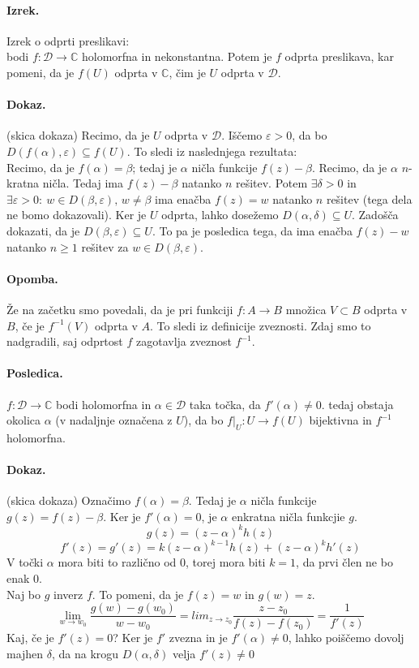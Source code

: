 \documentclass[a4paper]{article}
\newcommand{\C}{\mathbb{C}}
\newcommand{\fn}[3]{{#1}\colon {#2} \rightarrow {#3}}
\begin{document}
\paragraph{Izrek.} Izrek o odprti preslikavi: \\
bodi $\fn{f}{\mathcal{D}}{\C}$ holomorfna in nekonstantna. Potem je $f$ odprta preslikava, kar pomeni,
da je $f(U)$ odprta v $\C$, čim je $U$ odprta v $\mathcal{D}$.
\paragraph{Dokaz.} (skica dokaza) Recimo, da je $U$ odprta v $\mathcal{D}$. Iščemo $\varepsilon>0$, da bo $D(f(\alpha),\varepsilon) \subseteq f(U)$. To sledi iz naslednjega rezultata: \\
Recimo, da je $f(\alpha) = \beta$; tedaj je $\alpha$ ničla funkcije $f(z) - \beta$. Recimo, da je $\alpha$ $n$-kratna ničla. Tedaj ima $f(z) - \beta$ natanko $n$ rešitev.
Potem $\exists \delta > 0$ in $\exists \varepsilon > 0:~w\in D(\beta, \varepsilon),\,w\neq\beta$ ima enačba $f(z)=w$ natanko $n$ rešitev (tega dela ne bomo dokazovali).
Ker je $U$ odprta, lahko dosežemo $D(\alpha, \delta) \subseteq U$. Zadošča dokazati, da je $D(\beta, \varepsilon) \subseteq U$. To pa je posledica tega, da ima enačba $f(z) - w$ natanko $n \geq 1$ rešitev za $w \in D(\beta, \varepsilon)$.
\paragraph{Opomba.} Že na začetku smo povedali, da je pri funkciji $\fn{f}{A}{B}$ množica $V \subset B$ odprta v $B$, če je $f^{-1}(V)$ odprta v $A$. To sledi iz definicije zveznosti. Zdaj smo to nadgradili, saj odprtost $f$ zagotavlja zveznost $f^{-1}$.
\paragraph{Posledica.} $\fn{f}{\mathcal{D}}{\C}$ bodi holomorfna in $\alpha \in \mathcal{D}$ taka točka, da $f'(\alpha) \neq 0$. tedaj obstaja okolica $\alpha$ (v nadaljnje označena z $U$), da bo $\displaystyle{f\big|_U\colon U \to f(U)}$ bijektivna in $f^{-1}$ holomorfna.
\paragraph{Dokaz.} (skica dokaza) Označimo $f(\alpha) = \beta$. Tedaj je $\alpha$ ničla funkcije $g(z) = f(z) - \beta$. Ker je $f'(\alpha) = 0$, je $\alpha$ enkratna ničla funkcjie $g$.
$$g(z) = (z-\alpha)^kh(z)$$
$$f'(z) = g'(z) = k(z-\alpha)^{k-1}h(z) + (z-\alpha)^kh'(z)$$
V točki $\alpha$ mora biti to različno od $0$, torej mora biti $k=1$, da prvi člen ne bo enak 0. \\
Naj bo $g$ inverz $f$. To pomeni, da je $f(z) = w$ in $g(w) = z$. \\
$$\lim_{w \to w_0} \frac{g(w) - g(w_0)}{w - w_0} = lim_{z \to z_0} \frac{z-z_0}{f(z) - f(z_0)} = \frac{1}{f'(z)}$$
Kaj, če je $f'(z) = 0$? Ker je $f'$ zvezna in je $f'(\alpha) \neq 0$, lahko poiščemo dovolj majhen $\delta$, da na krogu $D(\alpha, \delta)$ velja $f'(z) \neq 0$
\end{document}
